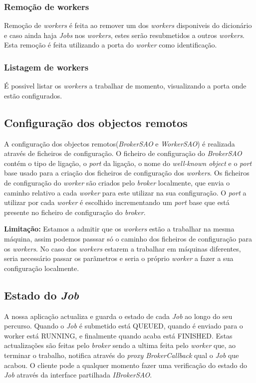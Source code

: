 \documentclass[a4paper]{article}
\begin{document}
\subsubsection{Remoção de workers}
Remoção de \emph{workers} é feita ao remover um dos \emph{workers} disponiveis do dicionário e caso ainda haja \emph{Jobs} nos \emph{workers}, estes serão resubmetidos a outros \emph{workers}.
Esta remoção é feita utilizando a porta do \emph{worker} como identificação.

\subsubsection{Listagem de workers}
É possivel listar os \emph{workers} a trabalhar de momento, visualizando a porta onde estão configurados.


\subsection{Configuração dos objectos remotos}
A configuração dos objectos remotos(\emph{BrokerSAO} e \emph{WorkerSAO}) é realizada através de ficheiros de configuração. O ficheiro de configuração do \emph{BrokerSAO} contém o tipo de ligação, o \emph{port } da ligação, o nome do \emph{well-known object } e o \emph{port} base usado para a criação dos ficheiros de configuração dos \emph{workers}.
Os ficheiros de configuração do \emph{worker} são criados pelo \emph{broker} localmente, que envia o caminho relativo a cada \emph{worker} para este utilizar na sua configuração. O \emph{port} a utilizar por cada \emph{worker} é escolhido incrementando um \emph{port} base que está presente no ficheiro de configuração do \emph{broker}.


\textbf{Limitação:} Estamos a admitir que os \emph{workers } estão a trabalhar na mesma máquina, assim podemos passsar só o caminho dos ficheiros de configuração para os \emph{workers}. No caso dos \emph{workers} estarem a trabalhar em máquinas diferentes, seria necessário passar os parãmetros e seria o próprio \emph{worker} a fazer a sua configuração localmente.


\subsection{Estado do \emph{Job}}
A nossa aplicação actualiza e guarda o estado de cada \emph{Job} ao longo do seu percurso. Quando o \emph{Job} é submetido está QUEUED, quando é enviado para o worker está RUNNING, e finalmente quando acaba está FINISHED. 
Estas actualizações são feitas pelo \emph{broker} sendo a ultima feita pelo \emph{worker} que, ao terminar o trabalho, notifica através do \emph{proxy BrokerCallback} qual o \emph{Job} que acabou.
O cliente pode a qualquer momento fazer uma verificação do estado do \emph{Job} através da interface partilhada \emph{IBrokerSAO}.
\end{document}
